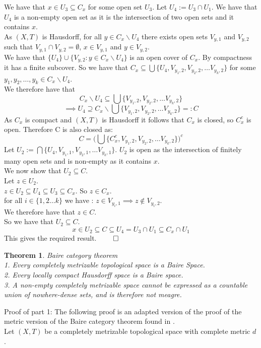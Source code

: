 \documentclass{report}
\newtheorem{theorem}{Theorem}[section]
\begin{document}
We have that $x\in U_3 \subseteq C_x$ for some open set $U_3$. Let $U_4:= U_3\cap U_1$. We have that $U_4$ is a non-empty open set as it is the intersection of two open sets and it contains $x$.\\
As $(X,T)$ is Hausdorff, for all $y \in C_x\backslash U_4$ there exists open sets $V_{y,1}$ and $V_{y,2}$ such that $V_{y,1}\cap V_{y,2} = \emptyset$, $x\in V_{y,1}$ and $y\in V_{y,2}$.\\
We have that $\{U_4\}\cup\{V_{y,2}:y\in C_x\backslash U_4\}$ is an open cover of $C_x$. By compactness it has a finite subcover. So we have that $C_x \subseteq \bigcup\{U_4,V_{y_1,2},V_{y_2,2},\ldots V_{y_k,2}\}$ for some $y_1,y_2,\ldots ,y_k \in C_x\backslash U_4$.\\
We therefore have that $$C_x \backslash U_4 \subseteq \bigcup\{V_{y_1,2},V_{y_2,2},\ldots V_{y_k,2}\}$$
$$\implies U_4 \supseteq C_x \backslash \bigcup\{V_{y_1,2},V_{y_2,2},\ldots V_{y_k,2}\}=: C$$
As $C_x$ is compact and $(X,T)$ is Hausdorff it follows that $C_x$ is closed, so $C_x^c$ is open. Therefore C is also closed as:
$$C=\big(\bigcup\{C_x^c,V_{y_1,2},V_{y_2,2},\ldots V_{y_k,2}\}\big)^c$$
Let $U_2 := \bigcap\{U_4, V_{y_1,1},V_{y_2,1},\ldots V_{y_k,1}\}$. $U_2$ is open as the intersection of finitely many open sets and is non-empty as it contains $x$.\\
We now show that $U_2 \subseteq C$.\\ Let $z\in U_2$.\\
$z\in U_2\subseteq U_4 \subseteq U_3 \subseteq C_x$. So $z \in C_x$.\\
for all $i\in \{1,2\ldots k\}$ we have : $z \in V_{y_i,1} \implies z \notin V_{y_i,2}$.\\
We therefore have that $z \in C$.\\
So we have that $U_2\subseteq C$.
\[x\in U_2 \subseteq C \subseteq U_4 =U_3\cap U_1 \subseteq C_x \cap U_1\]
This gives the required result. $\qed$
\begin{theorem}
Baire category theorem\\
1. Every completely metrizable topological space is a Baire Space.\\
2. Every locally compact Hausdorff space is a Baire space.\\
3. A non-empty completely metrizable space cannot be expressed as a countable union of nowhere-dense sets, and is therefore not meagre.
\end{theorem}\par
Proof of part 1: The following proof is an adapted version of the proof of the metric version of the Baire category theorem found in \cite{4004}.\\ Let $(X,T)$ be a completely metrizable topological space with complete metric $d$.\\
\end{document}
